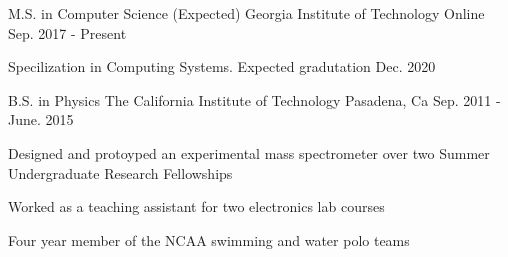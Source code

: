 

\begin{cventries}

  \cventry
    {M.S. in Computer Science (Expected)}
    {Georgia Institute of Technology}
    {Online}
    {Sep. 2017 - Present}
    {
      \begin{cvitems}
        \item {Specilization in Computing Systems. Expected gradutation Dec. 2020}
      \end{cvitems}
    }
  \cventry
    {B.S. in Physics} %
    {The California Institute of Technology} %
    {Pasadena, Ca} %
    {Sep. 2011 - June. 2015} %
    {
      \begin{cvitems}
        \item{Designed and protoyped an experimental mass spectrometer over two Summer Undergraduate Research Fellowships}
        \item{Worked as a teaching assistant for two electronics lab courses}
        \item{Four year member of the NCAA swimming and water polo teams}
      \end{cvitems}
    }



\end{cventries}
